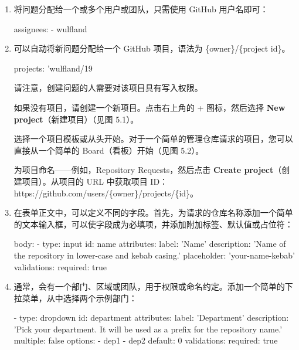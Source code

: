 \begin{enumerate}
\item 
将问题分配给一个或多个用户或团队，只需使用 GitHub 用户名即可：

\begin{shell}
assignees:
  - wulfland
\end{shell}

\item 
可以自动将新问题分配给一个 GitHub 项目，语法为 \{owner\}/\{project id\}。

\begin{shell}
projects: 'wulfland/19
\end{shell}

请注意，创建问题的人需要对该项目具有写入权限。

如果没有项目，请创建一个新项目。点击右上角的 + 图标，然后选择 \textbf{New project}（新建项目）（见图 5.1）。


选择一个项目模板或从头开始。对于一个简单的管理仓库请求的项目，您可以直接从一个简单的 Board（看板）开始（见图 5.2）。


为项目命名——例如，Repository Requests，然后点击 \textbf{Create project}（创建项目）。从项目的 URL 中获取项目 ID：https://github.com/users/\{owner\}/projects/\{id\}。

\item 
在表单正文中，可以定义不同的字段。首先，为请求的仓库名称添加一个简单的文本输入框，可以使字段成为必填项，并添加附加标签、默认值或占位符：

\begin{shell}
body:
  - type: input
    id: name
    attributes:
      label: 'Name'
      description: 'Name of the repository in lower-case and
kebab casing.'
      placeholder: 'your-name-kebab'
    validations:
      required: true
\end{shell}

\item 
通常，会有一个部门、区域或团队，用于权限或命名约定。添加一个简单的下拉菜单，从中选择两个示例部门：

\begin{shell}
- type: dropdown
  id: department
  attributes:
    label: 'Department'
    description: 'Pick your department. It will be used as a   prefix for the repository name.'
    multiple: false
    options:
      - dep1
      - dep2
    default: 0
  validations:
    required: true
\end{shell}


\end{enumerate}
